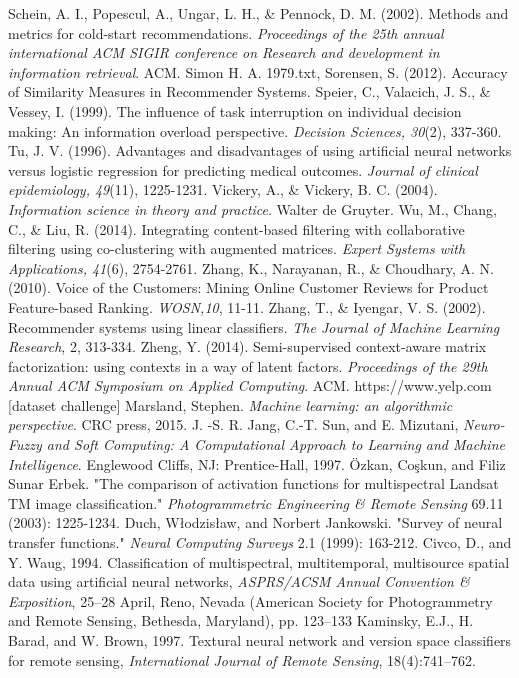 \documentclass[12pt]{article}
\begin{document}
\begin{thebibliography}{100}
 Schein, A. I., Popescul, A., Ungar, L. H., \& Pennock, D. M. (2002). Methods and metrics for cold-start recommendations. \textit{Proceedings of the 25th annual international ACM SIGIR conference on Research and development in information retrieval}. ACM.
 Simon H. A. 1979.txt,
 Sorensen, S. (2012). Accuracy of Similarity Measures in Recommender Systems.
 Speier, C., Valacich, J. S., \& Vessey, I. (1999). The influence of task interruption on individual decision making: An information overload perspective. \textit{Decision Sciences, 30}(2), 337-360.
 Tu, J. V. (1996). Advantages and disadvantages of using artificial neural networks versus logistic regression for predicting medical outcomes. \textit{Journal of clinical epidemiology, 49}(11), 1225-1231.
 Vickery, A., \& Vickery, B. C. (2004). \textit{Information science in theory and practice}. Walter de Gruyter.
 Wu, M., Chang, C., \& Liu, R. (2014). Integrating content-based filtering with collaborative filtering using co-clustering with augmented matrices. \textit{Expert Systems with Applications, 41}(6), 2754-2761.
 Zhang, K., Narayanan, R., \& Choudhary, A. N. (2010). Voice of the Customers: Mining Online Customer Reviews for Product Feature-based Ranking. \textit{WOSN,10}, 11-11.
 Zhang, T., \& Iyengar, V. S. (2002). Recommender systems using linear classifiers. \textit{The Journal of Machine Learning Research}, 2, 313-334.
 Zheng, Y. (2014). Semi-supervised context-aware matrix factorization: using contexts in a way of latent factors. \textit{Proceedings of the 29th Annual ACM Symposium on Applied Computing}. ACM.
 https://www.yelp.com [dataset challenge]
 Marsland, Stephen. \textit{Machine learning: an algorithmic perspective}. CRC press, 2015.
 J. -S. R. Jang, C.-T. Sun, and E. Mizutani, \textit{Neuro-Fuzzy and Soft Computing: A Computational Approach to Learning and Machine Intelligence}. Englewood Cliffs, NJ: Prentice-Hall, 1997.
 Özkan, Coşkun, and Filiz Sunar Erbek. "The comparison of activation functions for multispectral Landsat TM image classification." \textit{Photogrammetric Engineering \& Remote Sensing} 69.11 (2003): 1225-1234.
 Duch, Włodzisław, and Norbert Jankowski. "Survey of neural transfer functions." \textit{Neural Computing Surveys} 2.1 (1999): 163-212.
 Civco, D., and Y. Waug, 1994. Classification of multispectral, multitemporal, multisource spatial data using artificial neural networks, \textit{ASPRS/ACSM Annual Convention \& Exposition}, 25–28 April, Reno, Nevada (American Society for Photogrammetry and Remote Sensing, Bethesda, Maryland), pp. 123–133 
 Kaminsky, E.J., H. Barad, and W. Brown, 1997. Textural neural network and version space classifiers for remote sensing, \textit{International Journal of Remote Sensing}, 18(4):741–762.

\end{thebibliography} 
\end{document}
